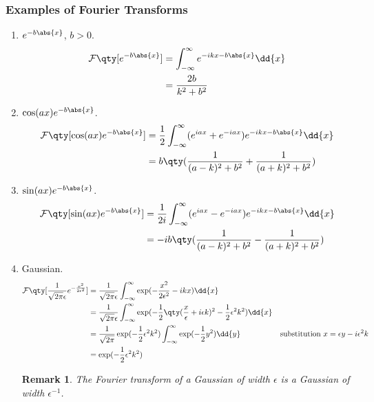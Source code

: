 \documentclass{article}
\theoremstyle{plain}\theoremheaderfont{\normalfont\itshape}\theorembodyfont{\rmfamily}\theoremseparator{.}\newtheorem*{rem}{Remark}\newtheorem*{ex}{Example}\newtheorem*{proof}{Proof}\newtheorem*{altp}{Alternative proof}
\theoremstyle{plain}\theoremheaderfont{\normalfont\bfseries}\theorembodyfont{\rmfamily}\theoremseparator{.}\newtheorem{thm}{Theorem}[section]\newtheorem{lem}[thm]{Lemma}\newtheorem{prop}[thm]{Proposition}\newtheorem*{cor}{Corollary}\newtheorem{defn}[thm]{Definition}\newtheorem{clm}[thm]{Claim}\newtheorem{clminproof}{Claim}
\theoremstyle{break}\theoremheaderfont{\normalfont\itshape}\theorembodyfont{\rmfamily}\theoremseparator{.\medskip}\newtheorem*{proofskip}{Proof}\newtheorem*{exs}{Examples}\newtheorem*{rems}{Remarks}
\theoremstyle{break}\theoremheaderfont{\normalfont\bfseries}\theorembodyfont{\rmfamily}\theoremseparator{.\medskip}\newtheorem{lemskip}[thm]{Lemma}\newtheorem{defnskip}[thm]{Definition}\newtheorem{propskip}[thm]{Proposition}\newtheorem{thmskip}[thm]{Theorem}
\numberwithin{equation}{section}
\begin{document}
	\subsubsection{Examples of Fourier Transforms}
	\begin{enumerate}[topsep=0pt]
		\item \(e^{-b\abs{x}}\), \(b>0\).
		\begin{align*}
			\mathcal{F}\qty[e^{-b\abs{x}}]&=\int_{-\infty}^{\infty}e^{-ikx-b\abs{x}}\dd{x}\\
			&=\frac{2b}{k^2+b^2}
		\end{align*}
		
		\item \(\cos(ax)e^{-b\abs{x}}\).
		\begin{align*}
			\mathcal{F}\qty[\cos(ax)e^{-b\abs{x}}]&=\frac{1}{2}\int_{-\infty}^{\infty}(e^{iax}+e^{-iax})e^{-ikx-b\abs{x}}\dd{x}\\
			&=b\qty(\frac{1}{(a-k)^2+b^2}+\frac{1}{(a+k)^2+b^2})
		\end{align*}
		
		\item \(\sin(ax)e^{-b\abs{x}}\).
		\begin{align*}
			\mathcal{F}\qty[\sin(ax)e^{-b\abs{x}}]&=\frac{1}{2i}\int_{-\infty}^{\infty}(e^{iax}-e^{-iax})e^{-ikx-b\abs{x}}\dd{x}\\
			&=-ib\qty(\frac{1}{(a-k)^2+b^2}-\frac{1}{(a+k)^2+b^2})
		\end{align*}
		
		\item Gaussian.
		\begin{align*}
			\mathcal{F}\qty[\frac{1}{\sqrt{2\pi}\epsilon}e^{-\frac{x^2}{2\epsilon^2}}]&=\frac{1}{\sqrt{2\pi}\epsilon}\int_{-\infty}^{\infty}\exp(-\frac{x^2}{2\epsilon^2}-ikx)\dd{x}\\
			&=\frac{1}{\sqrt{2\pi}\epsilon}\int_{-\infty}^{\infty}\exp(-\frac{1}{2}\qty(\frac{x}{\epsilon}+i\epsilon k)^2-\frac{1}{2}\epsilon^2k^2)\dd{x}\\
			&=\frac{1}{\sqrt{2\pi}}\exp(-\frac{1}{2}\epsilon^2k^2)\int_{-\infty}^{\infty}\exp(-\frac{1}{2}y^2)\dd{y} &\text{substitution }x=\epsilon y-i\epsilon^2 k\\
			&=\exp(-\frac{1}{2}\epsilon^2k^2)
		\end{align*}
		\begin{rem}
			The Fourier transform of a Gaussian of width \(\epsilon\) is a Gaussian of width \(\epsilon^{-1}\).
		\end{rem}


\end{enumerate}
\end{document}
